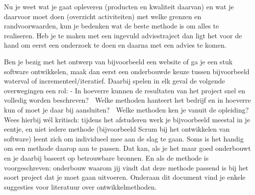Nu je weet wat je gaat opleveren (producten en kwaliteit daarvan) en wat je daarvoor moet doen (overzicht activiteiten) met welke grenzen en randvoorwaarden, kun je bedenken wat de beste methode is om alles te realiseren. Heb je te maken met een ingevuld adviestraject dan ligt het voor de hand om eerst een onderzoek te doen en daarna met een advies te komen.

Ben je bezig met het ontwerp van bijvoorbeeld een website of ga je een stuk software ontwikkelen, maak dan eerst een onderbouwde keuze tussen bijvoorbeeld waterval of incrementeel/iteratief. Daarbij spelen in elk geval de volgende overwegingen een rol:
- In hoeverre kunnen de resultaten van het project snel en volledig worden beschreven?  Welke methoden hanteert het bedrijf en in hoeverre kun of moet je daar bij aansluiten?  Welke methoden ken je vanuit de opleiding?
Wees hierbij wél kritisch: tijdens het afstuderen werk je bijvoorbeeld meestal in je eentje, en niet iedere methode (bijvoorbeeld Scrum bij het ontwikkelen van software) leent zich om individueel mee aan de slag te gaan. Soms is het handig om een methode daarop aan te passen. Dat kan, als je het maar goed onderbouwt en je daarbij baseert op betrouwbare bronnen. En als de methode is voorgeschreven: onderbouw waarom jij vindt dat deze methode passend is bij het soort project dat je moet gaan uitvoeren. Onderaan dit document vind je enkele suggesties voor literatuur over ontwikkelmethoden.